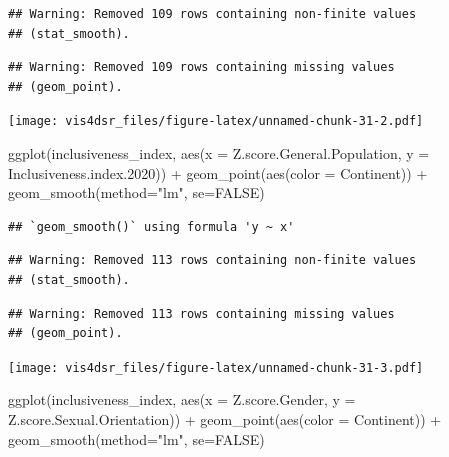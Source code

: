 \documentclass[
]{krantz}
\makeatletter
\newenvironment{Shaded}{\begin{snugshade}}{\end{snugshade}}
\newcommand{\AttributeTok}[1]{\textcolor[rgb]{0.61,0.61,0.61}{#1}}
\newcommand{\ConstantTok}[1]{\textcolor[rgb]{0,0,0}{#1}}
\newcommand{\FloatTok}[1]{\textcolor[rgb]{0.06,0.06,0.06}{#1}}
\newcommand{\FunctionTok}[1]{\textcolor[rgb]{0,0,0}{#1}}
\newcommand{\NormalTok}[1]{#1}
\newcommand{\SpecialCharTok}[1]{\textcolor[rgb]{0,0,0}{#1}}
\newcommand{\StringTok}[1]{\textcolor[rgb]{0.5,0.5,0.5}{#1}}
\newenvironment{kframe}{%
\medskip{}
\setlength{\fboxsep}{.8em}
 \def\at@end@of@kframe{}%
 \ifinner\ifhmode%
  \def\at@end@of@kframe{\end{minipage}}%
  \begin{minipage}{\columnwidth}%
 \fi\fi%
 \def\FrameCommand##1{\hskip\@totalleftmargin \hskip-\fboxsep
 \colorbox{shadecolor}{##1}\hskip-\fboxsep
     \hskip-\linewidth \hskip-\@totalleftmargin \hskip\columnwidth}%
 \MakeFramed {\advance\hsize-\width
   \@totalleftmargin\z@ \linewidth\hsize
   \@setminipage}}%
 {\par\unskip\endMakeFramed%
 \at@end@of@kframe}
\renewenvironment{Shaded}{\begin{kframe}}{\end{kframe}}
\makeatother
\begin{document}
\begin{verbatim}
## Warning: Removed 109 rows containing non-finite values
## (stat_smooth).
\end{verbatim}

\begin{verbatim}
## Warning: Removed 109 rows containing missing values
## (geom_point).
\end{verbatim}

\texttt{[image: vis4dsr\_files/figure-latex/unnamed-chunk-31-2.pdf]}

\begin{Shaded}
\begin{Highlighting}[]
\FunctionTok{ggplot}\NormalTok{(inclusiveness\_index, }
       \FunctionTok{aes}\NormalTok{(}\AttributeTok{x =}\NormalTok{ Z.score.General.Population, }
           \AttributeTok{y =}\NormalTok{ Inclusiveness.index}\FloatTok{.2020}\NormalTok{)) }\SpecialCharTok{+}
  \FunctionTok{geom\_point}\NormalTok{(}\FunctionTok{aes}\NormalTok{(}\AttributeTok{color =}\NormalTok{ Continent)) }\SpecialCharTok{+}
  \FunctionTok{geom\_smooth}\NormalTok{(}\AttributeTok{method=}\StringTok{"lm"}\NormalTok{, }\AttributeTok{se=}\ConstantTok{FALSE}\NormalTok{)}
\end{Highlighting}
\end{Shaded}

\begin{verbatim}
## `geom_smooth()` using formula 'y ~ x'
\end{verbatim}

\begin{verbatim}
## Warning: Removed 113 rows containing non-finite values
## (stat_smooth).
\end{verbatim}

\begin{verbatim}
## Warning: Removed 113 rows containing missing values
## (geom_point).
\end{verbatim}

\texttt{[image: vis4dsr\_files/figure-latex/unnamed-chunk-31-3.pdf]}

\begin{Shaded}
\begin{Highlighting}[]
\FunctionTok{ggplot}\NormalTok{(inclusiveness\_index, }
       \FunctionTok{aes}\NormalTok{(}\AttributeTok{x =}\NormalTok{ Z.score.Gender, }
           \AttributeTok{y =}\NormalTok{ Z.score.Sexual.Orientation)) }\SpecialCharTok{+}
  \FunctionTok{geom\_point}\NormalTok{(}\FunctionTok{aes}\NormalTok{(}\AttributeTok{color =}\NormalTok{ Continent)) }\SpecialCharTok{+}
  \FunctionTok{geom\_smooth}\NormalTok{(}\AttributeTok{method=}\StringTok{"lm"}\NormalTok{, }\AttributeTok{se=}\ConstantTok{FALSE}\NormalTok{)}
\end{Highlighting}
\end{Shaded}
\end{document}

